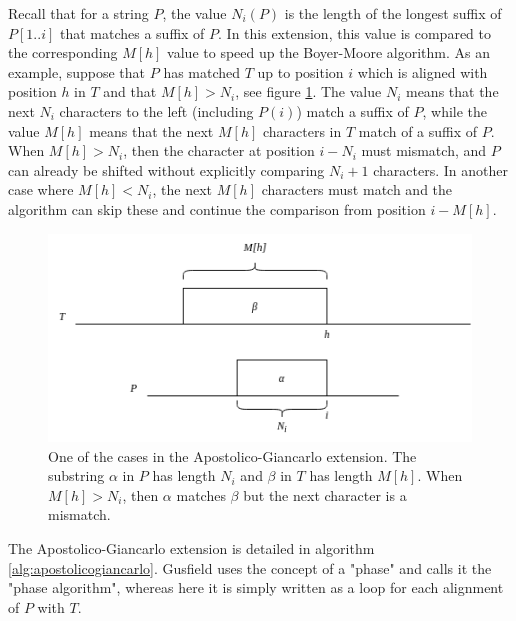 Recall that for a string $P$, the value $N_i(P)$ is the length of the longest suffix of $P[1..i]$ that matches a suffix of $P$. In this extension, this value is compared to the corresponding $M[h]$ value to speed up the Boyer-Moore algorithm. As an example, suppose that $P$ has matched $T$ up to position $i$ which is aligned with position $h$ in $T$ and that $M[h]>N_i$, see figure \ref{fig:Apostolicocase}. The value $N_i$ means that the next $N_i$ characters to the left (including $P(i)$) match a suffix of $P$, while the value $M[h]$ means that the next $M[h]$ characters in $T$ match of a suffix of $P$. When $M[h]>N_i$, then the character at position $i-N_i$ must mismatch, and $P$ can already be shifted without explicitly comparing $N_i+1$ characters. In another case where $M[h]<N_i$, the next $M[h]$ characters must match and the algorithm can skip these and continue the comparison from position $i-M[h]$. 

\begin{figure}[th!]
    \centering
    \includegraphics[width=.9\textwidth]{LaTeX/Figures/Zalg/Apostolicocase.png}
    \caption{One of the cases in the Apostolico-Giancarlo extension. The substring $\alpha$ in $P$ has length $N_i$ and $\beta$ in $T$ has length $M[h]$. When $M[h]>N_i$, then $\alpha$ matches $\beta$ but the next character is a mismatch. }
    \label{fig:Apostolicocase}
\end{figure}

The Apostolico-Giancarlo extension is detailed in algorithm \ref{alg:apostolicogiancarlo}. Gusfield\cite{Gusfield1997AlgorithmsOS} uses the concept of a "phase" and calls it the "phase algorithm", whereas here it is simply written as a loop for each alignment of $P$ with $T$. 

